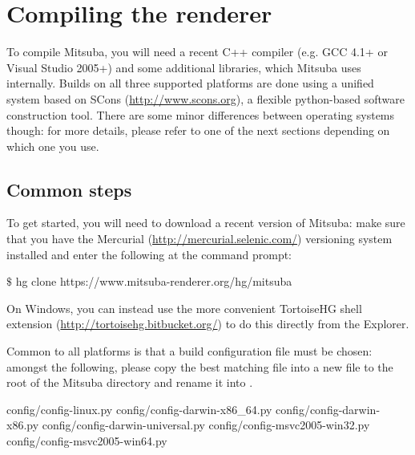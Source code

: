 \section{Compiling the renderer}
To compile Mitsuba, you will need a recent C++ compiler (e.g. GCC 4.1+ or 
Visual Studio 2005+) and some additional libraries, which Mitsuba uses internally. 
Builds on all three supported platforms are done using a unified system
based on SCons (\url{http://www.scons.org}), a flexible python-based 
software construction tool. There are some minor differences between operating systems though: for
more details, please refer to one of the next sections depending on which one you use.

\subsection{Common steps}
To get started, you will need to download a recent version of Mitsuba: make sure that you have the Mercurial (\url{http://mercurial.selenic.com/})
versioning system installed and enter the following at the command prompt:
\begin{shell}
$\texttt{\$}$ hg clone https://www.mitsuba-renderer.org/hg/mitsuba
\end{shell}
On Windows, you can instead use the more convenient TortoiseHG shell extension (\url{http://tortoisehg.bitbucket.org/}) 
to do this directly from the Explorer.

Common to all platforms is that a build configuration file must be chosen: amongst the
following, please copy the best matching file into a new file to the root of the Mitsuba
directory and rename it into .
\begin{shell}
config/config-linux.py  
config/config-darwin-x86_64.py  
config/config-darwin-x86.py  
config/config-darwin-universal.py  
config/config-msvc2005-win32.py  
config/config-msvc2005-win64.py
\end{shell}

